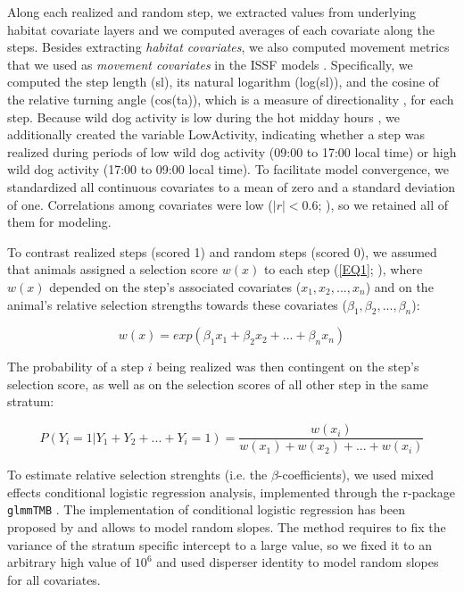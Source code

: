 \documentclass[abstract=on,10pt,a4paper,bibliography=totocnumbered]{article}
\begin{document}
Along each realized and random step, we extracted values from underlying habitat
covariate layers and we computed averages of each covariate along the steps.
Besides extracting \textit{habitat covariates}, we also computed movement
metrics that we used as \textit{movement covariates} in the ISSF models
\citep{Avgar.2016, Fieberg.2021}. Specifically, we computed the step length
(\textsf{sl}), its natural logarithm (\textsf{log(sl)}), and the cosine of the
relative turning angle (\textsf{cos(ta)}), which is a measure of directionality
\citep{Turchin.1998}, for each step. Because wild dog activity is low during the
hot midday hours \citep{Cozzi.2012}, we additionally created the variable
\textsf{LowActivity}, indicating whether a step was realized during periods of
low wild dog activity (09:00 to 17:00 local time) or high wild dog activity
(17:00 to 09:00 local time). To facilitate model convergence, we standardized
all continuous covariates to a mean of zero and a standard deviation of one.
Correlations among covariates were low (\(|r| < 0.6\); \citealp{Latham.2011}),
so we retained all of them for modeling.

To contrast realized steps (scored 1) and random steps (scored 0), we assumed
that animals assigned a selection score \(w(x)\) to each step (\ref{EQ1};
\citealp{Fortin.2005}), where \(w(x)\) depended on the step's associated
covariates (\(x_1, x_2, ..., x_n\)) and on the animal's relative selection
strengths \citealp{Avgar.2017} towards these covariates (\(\beta_1, \beta_2,
..., \beta_n\)):

\begin{equation}
\label{EQ1}
  w(x) = exp(\beta_1 x_1 + \beta_2 x_2 + ... + \beta_n x_n)
\end{equation}

\noindent The probability of a step \(i\) being realized was then contingent on
the step's selection score, as well as on the selection scores of all other step
in the same stratum:

\begin{equation}
\label{EQ2}
  P(Y_{i} = 1 | Y_{1} + Y_{2} + ... + Y_{i} = 1) =
  \frac{w(x_{i})}{w(x_{1}) + w(x_{2}) + ... + w(x_{i})}
\end{equation}

\noindent To estimate relative selection strenghts (i.e. the
\(\beta\)-coefficients), we used mixed effects conditional logistic regression
analysis, implemented through the r-package {\tt glmmTMB} \citep{Brooks.2017}.
The implementation of conditional logistic regression has been proposed by
\cite{Muff.2020} and allows to model random slopes. The method requires to fix
the variance of the stratum specific intercept to a large value, so we fixed it
to an arbitrary high value of \(10 ^ 6\) and used disperser identity to model
random slopes for all covariates.
\end{document}
